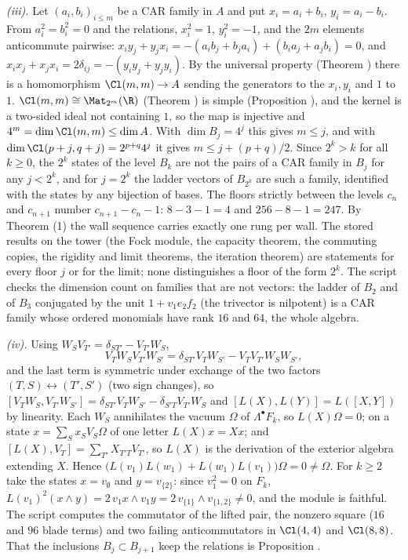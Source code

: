 \emph{(iii).} Let $(a_{i}, b_{i})_{i \le m}$ be a CAR family in $A$ and put $x_{i} = a_{i} + b_{i}$, $y_{i} = a_{i} - b_{i}$. From $a_{i}^{2} = b_{i}^{2} = 0$ and the relations, $x_{i}^{2} = 1$, $y_{i}^{2} = -1$, and the $2m$ elements anticommute pairwise: $x_{i}y_{j} + y_{j}x_{i} = -(a_{i}b_{j} + b_{j}a_{i}) + (b_{i}a_{j} + a_{j}b_{i}) = 0$, and $x_{i}x_{j} + x_{j}x_{i} = 2\delta_{ij} = -(y_{i}y_{j} + y_{j}y_{i})$. By the universal property (Theorem ) there is a homomorphism $\Cl(m,m) \to A$ sending the generators to the $x_{i}, y_{i}$ and $1$ to $1$. $\Cl(m,m) \cong \Mat_{2^{m}}(\R)$ (Theorem ) is simple (Proposition ), and the kernel is a two-sided ideal not containing $1$, so the map is injective and $4^{m} = \dim\Cl(m,m) \le \dim A$. With $\dim B_{j} = 4^{j}$ this gives $m \le j$, and with $\dim\Cl(p + j, q + j) = 2^{p+q}4^{j}$ it gives $m \le j + (p+q)/2$. Since $2^{k} > k$ for all $k \ge 0$, the $2^{k}$ states of the level $B_{k}$ are not the pairs of a CAR family in $B_{j}$ for any $j < 2^{k}$, and for $j = 2^{k}$ the ladder vectors of $B_{2^{k}}$ are such a family, identified with the states by any bijection of bases. The floors strictly between the levels $c_{n}$ and $c_{n+1}$ number $c_{n+1} - c_{n} - 1$: $8 - 3 - 1 = 4$ and $256 - 8 - 1 = 247$. By Theorem (1) the wall sequence carries exactly one rung per wall. The stored results on the tower (the Fock module, the capacity theorem, the commuting copies, the rigidity and limit theorems, the iteration theorem) are statements for every floor $j$ or for the limit; none distinguishes a floor of the form $2^{k}$. The script checks the dimension count on families that are not vectors: the ladder of $B_{2}$ and of $B_{3}$ conjugated by the unit $1 + v_{1}e_{2}f_{2}$ (the trivector is nilpotent) is a CAR family whose ordered monomials have rank $16$ and $64$, the whole algebra.

\emph{(iv).} Using $W_{S}V_{T'} = \delta_{ST'} - V_{T'}W_{S}$,
\[
V_{T}W_{S}V_{T'}W_{S'} = \delta_{ST'}V_{T}W_{S'} - V_{T}V_{T'}W_{S}W_{S'} ,
\]
and the last term is symmetric under exchange of the two factors $(T, S) \leftrightarrow (T', S')$ (two sign changes), so $[V_{T}W_{S}, V_{T'}W_{S'}] = \delta_{ST'}V_{T}W_{S'} - \delta_{S'T}V_{T'}W_{S}$ and $[L(X), L(Y)] = L([X, Y])$ by linearity. Each $W_{S}$ annihilates the vacuum $\Omega$ of $\Lambda^{\bullet}F_{k}$, so $L(X)\Omega = 0$; on a state $x = \sum_{S}x_{S}V_{S}\Omega$ of one letter $L(X)x = Xx$; and $[L(X), V_{T}] = \sum_{T'}X_{T'T}V_{T'}$, so $L(X)$ is the derivation of the exterior algebra extending $X$. Hence $\bigl(L(v_{1})L(w_{1}) + L(w_{1})L(v_{1})\bigr)\Omega = 0 \neq \Omega$. For $k \ge 2$ take the states $x = v_{\emptyset}$ and $y = v_{\{2\}}$: since $v_{1}^{2} = 0$ on $F_{k}$, $L(v_{1})^{2}(x \wedge y) = 2\,v_{1}x \wedge v_{1}y = 2\,v_{\{1\}} \wedge v_{\{1,2\}} \neq 0$, and the module is faithful. The script computes the commutator of the lifted pair, the nonzero square ($16$ and $96$ blade terms) and two failing anticommutators in $\Cl(4,4)$ and $\Cl(8,8)$. That the inclusions $B_{j} \subset B_{j+1}$ keep the relations is Proposition .

